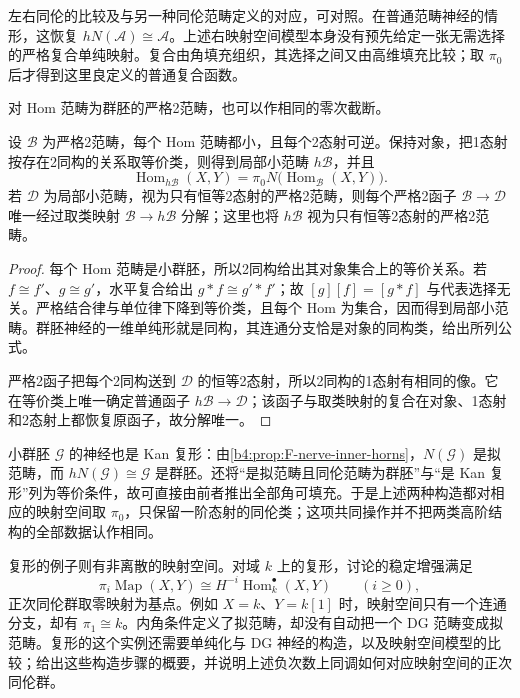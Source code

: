 左右同伦的比较及与另一种同伦范畴定义的对应，可对照\cite[Remark 1.2.3.6; Propositions 1.2.3.7--1.2.3.9]{Lurie2009HigherToposTheory}。在普通范畴神经的情形，这恢复 \(hN(\mathcal A)\cong\mathcal A\)。上述右映射空间模型本身没有预先给定一张无需选择的严格复合单纯映射。复合由角填充组织，其选择之间又由高维填充比较；取 \(\pi_0\) 后才得到这里良定义的普通复合函数。

\ProseParagraphBreak
对 Hom 范畴为群胚的严格2范畴，也可以作相同的零次截断。

\begin{proposition}\label{b4:prop:F-two-isomorphism-quotient}
	设 \(\mathcal B\) 为严格2范畴，每个 Hom 范畴都小，且每个2态射可逆。保持对象，把1态射按存在2同构的关系取等价类，则得到局部小范畴 \(h\mathcal B\)，并且
	\[
		\operatorname{Hom}_{h\mathcal B}(X,Y) =\pi_0N\bigl(\operatorname{Hom}_{\mathcal B}(X,Y)\bigr).
	\]
	若 \(\mathcal D\) 为局部小范畴，视为只有恒等2态射的严格2范畴，则每个严格2函子 \(\mathcal B\rightarrow\mathcal D\) 唯一经过取类映射 \(\mathcal B\rightarrow h\mathcal B\) 分解；这里也将 \(h\mathcal B\) 视为只有恒等2态射的严格2范畴。
\end{proposition}
\begin{proof}
	每个 Hom 范畴是小群胚，所以2同构给出其对象集合上的等价关系。若 \(f\cong f'\)、\(g\cong g'\)，水平复合给出 \(g*f\cong g'*f'\)；故 \([g][f]=[g*f]\) 与代表选择无关。严格结合律与单位律下降到等价类，且每个 Hom 为集合，因而得到局部小范畴。群胚神经的一维单纯形就是同构，其连通分支恰是对象的同构类，给出所列公式。

	严格2函子把每个2同构送到 \(\mathcal D\) 的恒等2态射，所以2同构的1态射有相同的像。它在等价类上唯一确定普通函子 \(h\mathcal B\rightarrow\mathcal D\)；该函子与取类映射的复合在对象、1态射和2态射上都恢复原函子，故分解唯一。
\end{proof}

小群胚 \(\mathcal G\) 的神经也是 Kan 复形：由\cref{b4:prop:F-nerve-inner-horns}，\(N(\mathcal G)\) 是拟范畴，而 \(hN(\mathcal G)\cong\mathcal G\) 是群胚。\cite[Proposition 1.2.5.1]{Lurie2009HigherToposTheory}还将“是拟范畴且同伦范畴为群胚”与“是 Kan 复形”列为等价条件，故可直接由前者推出全部角可填充。于是上述两种构造都对相应的映射空间取 \(\pi_0\)，只保留一阶态射的同伦类；这项共同操作并不把两类高阶结构的全部数据认作相同。

\ProseParagraphBreak
复形的例子则有非离散的映射空间。对域 \(k\) 上的复形，讨论的稳定增强满足
\[
	\pi_i\operatorname{Map}(X,Y) \cong H^{-i}\operatorname{Hom}^{\bullet}_k(X,Y) \qquad(i\ge0),
\]
正次同伦群取零映射为基点。例如 \(X=k\)、\(Y=k[1]\) 时，映射空间只有一个连通分支，却有 \(\pi_1\cong k\)。内角条件定义了拟范畴，却没有自动把一个 DG 范畴变成拟范畴。复形的这个实例还需要单纯化与 DG 神经的构造，以及映射空间模型的比较；给出这些构造步骤的概要，并说明上述负次数上同调如何对应映射空间的正次同伦群。
